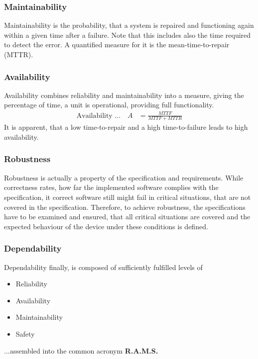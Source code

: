 	\subsubsection{Maintainability}
	{Maintainability} is the probability, that a system is repaired and functioning again within a given time after a failure. Note that this includes also the time required to detect the error.
	A quantified measure for it is the mean-time-to-repair (MTTR).
	\subsubsection{Availability}
	{Availability} combines reliability and maintainability into a measure, giving the percentage of time, a unit is operational, providing full functionality.
		\begin{align*}
	\textrm{Availability ...} \quad A & = \frac{MTTF}{MTTF + MTTR}
		\end{align*}
	It is apparent, that a low time-to-repair and a high time-to-failure leads to high availability.
	\subsubsection{Robustness}
		Robustness is actually a property of the specification and requirements. While correctness rates, how far the implemented software complies with the specification, it correct software still might fail in critical situations, that are not covered in the specification. Therefore, to achieve robustness, the specifications have to be examined and ensured, that all critical situations are covered and the expected behaviour of the device under these conditions is defined.
	\subsubsection{Dependability}
	{Dependability} finally, is composed of sufficiently fulfilled levels of \\
		\begin{itemize}
			\item Reliability
			\item Availability
			\item Maintainability
			\item Safety
		\end{itemize}
	...assembled into the common acronym {\bf R.A.M.S.}
	
